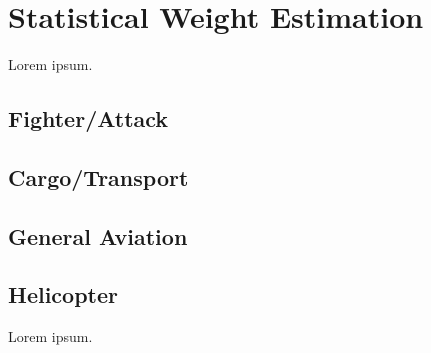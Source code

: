 \section{Statistical Weight Estimation}

Lorem ipsum. \cite{NASA-TP-2015-218751,Raymer1992}

\subsection{Fighter/Attack}

\subsection{Cargo/Transport}

\subsection{General Aviation}

\subsection{Helicopter}

Lorem ipsum. \cite{NASA-TP-2015-218751}

